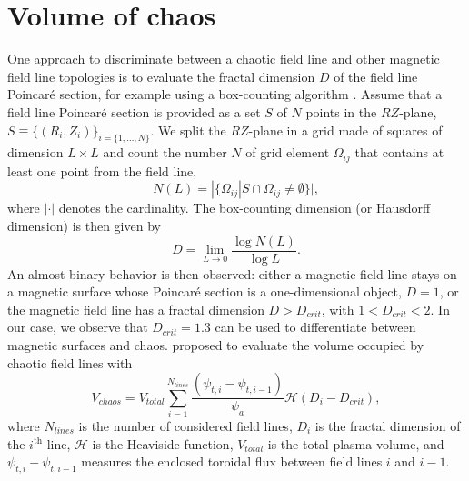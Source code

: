 \documentclass[my_thesis.tex]{subfiles}
\begin{document}
\section{Volume of chaos}
One approach to discriminate between a chaotic field line and other magnetic field line topologies is to evaluate the fractal dimension $D$ of the field line Poincar\'e section, for example using a box-counting algorithm \citep{Meiss1992c}. Assume that a field line Poincar\'e section is provided as a set $S$ of $N$ points in the $RZ$-plane, $S\equiv\{(R_i,Z_i)\}_{i=\{1,\ldots,N\}}$. We split the $RZ$-plane in a grid made of squares of dimension $L\times L$ and count the number $N$ of grid element $\Omega_{ij}$ that contains at least one point from the field line,
\begin{equation}
    N(L) = |\{\Omega_{ij}|S\cap\Omega_{ij}\neq\emptyset\}|,
\end{equation}
where $|\cdot|$ denotes the cardinality. The box-counting dimension (or Hausdorff dimension) is then given by
\begin{equation}
    D = \lim_{L\rightarrow 0} \frac{\log N(L)}{\log L}.
\end{equation}
An almost binary behavior is then observed: either a magnetic field line stays on a magnetic surface whose Poincar\'e section is a one-dimensional object, $D=1$, or the magnetic field line has a fractal dimension $D>D_{crit}$, with $1<D_{crit}<2$. In our case, we observe that $D_{crit}=1.3$ can be used to differentiate between magnetic surfaces and chaos.
\citet{Loizu2017} proposed to evaluate the volume occupied by chaotic field lines with
\begin{equation}
	V_{chaos} = V_{total} \sum_{i=1}^{N_{lines}} \frac{(\psi_{t,i}-\psi_{t,i-1})}{\psi_a}\mathcal{H}(D_i-D_{crit}), \label{eq.volume chaos}
\end{equation}
where $N_{lines}$ is the number of considered field lines, $D_i$ is the fractal dimension of the $i^{\text{th}}$ line, $\mathcal{H}$ is the Heaviside function, $V_{total}$ is the total plasma volume, and $\psi_{t,i}-\psi_{t,i-1}$ measures the enclosed toroidal flux between field lines $i$ and $i-1$.
\end{document}

